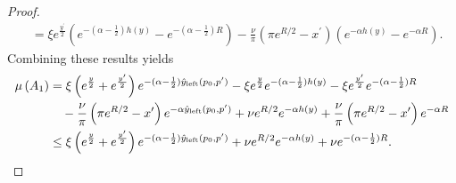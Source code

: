 \begin{proof}
\begin{align*}
	&= \xi e^{\frac{y^\prime}{2}}\left(e^{-(\alpha - \frac{1}{2})h(y)} - e^{-(\alpha - \frac{1}{2})R}\right)
		- \frac{\nu}{\pi}\left(\pi e^{R/2} - x^\prime\right)
		\left(e^{-\alpha h(y)}- e^{-\alpha R}\right).
\end{align*}
Combining these results yields
\begin{align*}
	\mu\left(A_1\right) &= \xi \left(e^{\frac{y}{2}} + e^{\frac{y^\prime}{2}}\right)
		e^{-(\alpha - \frac{1}{2})\hat{y}_{\text{left}}(p_0,p^\prime)}
		- \xi e^{\frac{y}{2}} e^{-(\alpha - \frac{1}{2})h(y)}
		- \xi e^{\frac{y^\prime}{2}} e^{-(\alpha-\frac{1}{2})R} \\
	&\hspace{10pt}- \frac{\nu}{\pi} \left(\pi e^{R/2} - x^\prime\right)
		e^{-\alpha\hat{y}_{\text{left}}(p_0,p^\prime)}
		+ \nu e^{R/2}e^{-\alpha h(y)} + \frac{\nu}{\pi}\left(\pi e^{R/2} - x^\prime\right) e^{-\alpha R}\\
	&\le \xi \left(e^{\frac{y}{2}} + e^{\frac{y^\prime}{2}}\right)
		e^{-(\alpha - \frac{1}{2})\hat{y}_{\text{left}}(p_0,p^\prime)}
		+ \nu e^{R/2}e^{-\alpha h(y)} + \nu e^{-(\alpha - \frac{1}{2}) R}.
\end{align*}


\end{proof}
